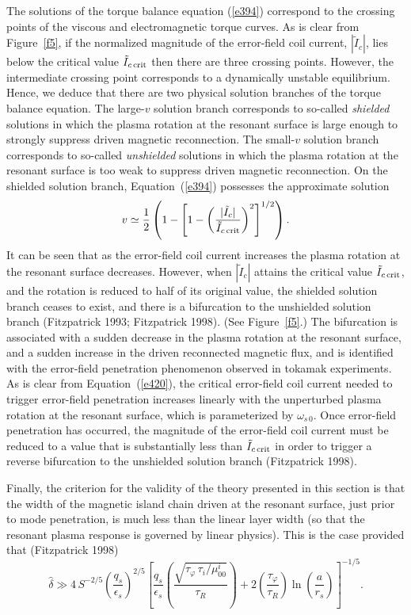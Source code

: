 \documentclass[notitlepage,12pt]{article}
\begin{document}
The solutions of the torque balance equation (\ref{e394}) correspond to the crossing points of the viscous and electromagnetic torque
curves. As is clear from Figure~\ref{f5}, if the normalized magnitude of the error-field coil current, $|\tilde{I}_c|$, lies below
the critical value $\tilde{I}_{c\,{\rm crit}}$ then there are three crossing points. However, the intermediate crossing point corresponds to
a dynamically unstable equilibrium. Hence, we deduce that there are two physical solution branches of the torque
balance equation. The large-$v$ solution branch corresponds to  so-called {\em shielded}\/ solutions in which the plasma
rotation at the resonant surface is large enough to strongly suppress driven magnetic reconnection. The small-$v$
solution branch corresponds to so-called {\em unshielded}\/ solutions  in which the plasma rotation at the resonant surface is
too weak to suppress driven magnetic reconnection. 
On the shielded solution branch, Equation~(\ref{e394}) possesses the approximate solution
\begin{equation}
v \simeq \frac{1}{2}\left(1-\left[1-\left(\frac{|\tilde{I}_c|}{\tilde{I}_{c\,{\rm crit}}}\right)^2\right]^{1/2}
\right).
\end{equation}
It can be seen that as the error-field coil current increases  the plasma rotation at the resonant surface decreases. However, when
$|\tilde{I}_c|$ attains the critical value $\tilde{I}_{c\,{\rm crit}}$, and the rotation is reduced to half of its
original value, the shielded solution branch ceases to exist, and there is a bifurcation to the unshielded solution branch (Fitzpatrick 1993;
Fitzpatrick 1998). (See Figure~\ref{f5}.)
The bifurcation is associated with a sudden decrease in the plasma rotation at the resonant surface, and a sudden
increase in the driven reconnected magnetic flux, and is identified with the error-field penetration phenomenon observed in tokamak
experiments. As is clear from Equation~(\ref{e420}), the critical error-field coil current needed to trigger error-field
penetration increases linearly with the unperturbed plasma rotation at the resonant surface, which is parameterized by $\omega_{s\,0}$. 
Once error-field penetration has occurred, the magnitude of the error-field coil current must be reduced to a value
that is substantially less than $\tilde{I}_{c\,{\rm crit}}$ in order to trigger a reverse bifurcation to the unshielded solution branch (Fitzpatrick 1998). 

Finally, the criterion for the validity of the theory presented in this section is that the width of the magnetic island
chain driven at the resonant surface, just prior to mode penetration, is much less than the linear layer width (so that the resonant
plasma response is governed by linear physics). This is the case provided that (Fitzpatrick 1998)
\begin{equation}
\hat{\delta}\gg 4\,S^{-2/5}\left(\frac{q_s}{\epsilon_s}\right)^{2/5}\left[\frac{q_s}{\epsilon_s}\left(\frac{\sqrt{\tau_\varphi\,\tau_i/\mu_{00}^i}}{\tau_R}\right)+2\left(\frac{\tau_\varphi}{\tau_R}\right) \ln\!\left(\frac{a}{r_s}\right)\right]^{-1/5}.
\end{equation}
\end{document}
